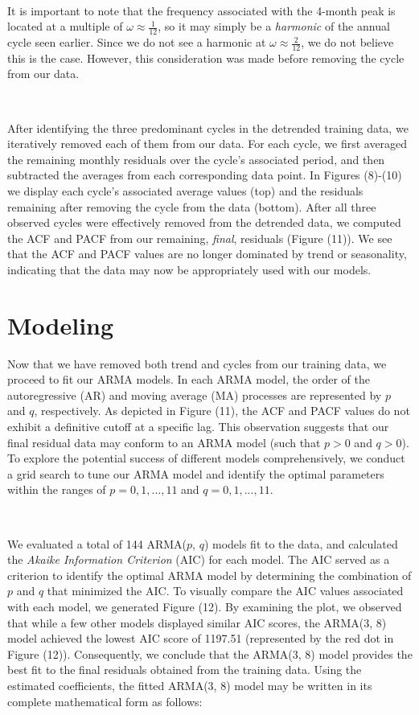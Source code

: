 \documentclass[10pt]{article}
\begin{document}
\

It is important to note that the frequency associated with the 4-month peak is located at a multiple of $\omega \approx \frac{1}{12}$, so it may simply be a \textit{harmonic} of the annual cycle seen earlier. Since we do not see a harmonic at $\omega \approx \frac{2}{12}$, we do not believe this is the case. However, this consideration was made before removing the cycle from our data.

\

After identifying the three predominant cycles in the detrended training data, we iteratively removed each of them from our data. For each cycle, we first averaged the remaining monthly residuals over the cycle's associated period, and then subtracted the averages from each corresponding data point. In Figures (8)-(10) we display each cycle's associated average values (top) and the residuals remaining after removing the cycle from the data (bottom). After all three observed cycles were effectively removed from the detrended data, we computed the ACF and PACF from our remaining, \textit{final}, residuals (Figure (11)). We see that the ACF and PACF values are no longer dominated by trend or seasonality, indicating that the data may now be appropriately used with our models.

\section*{Modeling}

Now that we have removed both trend and cycles from our training data, we proceed to fit our ARMA models. In each ARMA model, the order of the autoregressive (AR) and moving average (MA) processes are represented by $p$ and $q$, respectively. As depicted in Figure (11), the ACF and PACF values do not exhibit a definitive cutoff at a specific lag. This observation suggests that our final residual data may conform to an ARMA model (such that $p>0$ and $q>0$). To explore the potential success of different models comprehensively, we conduct a grid search to tune our ARMA model and identify the optimal parameters within the ranges of $p=0, 1, ..., 11$ and $q=0, 1, ..., 11$.

\

We evaluated a total of 144 ARMA($p$, $q$) models fit to the data, and calculated the \textit{Akaike Information Criterion} (AIC) for each model. The AIC served as a criterion to identify the optimal ARMA model by determining the combination of $p$ and $q$ that minimized the AIC. To visually compare the AIC values associated with each model, we generated Figure (12). By examining the plot, we observed that while a few other models displayed similar AIC scores, the ARMA(3, 8) model achieved the lowest AIC score of 1197.51 (represented by the red dot in Figure (12)). Consequently, we conclude that the ARMA(3, 8) model provides the best fit to the final residuals obtained from the training data. Using the estimated coefficients, the fitted ARMA(3, 8) model may be written in its complete mathematical form as follows:
\end{document}

